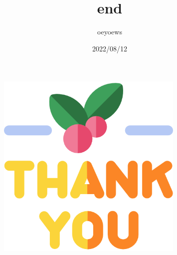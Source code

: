 \documentclass[UTF8]{article}
\title{end \emoji{rocket}}
\author{oeyoews}
\date{2022/08/12}
\begin{document}
\maketitle

\begin{figure}[htpb]
	\centering
	\includegraphics[width=0.8\textwidth]{end}
	\label{fig:img-end}
\end{figure}
\end{document}
